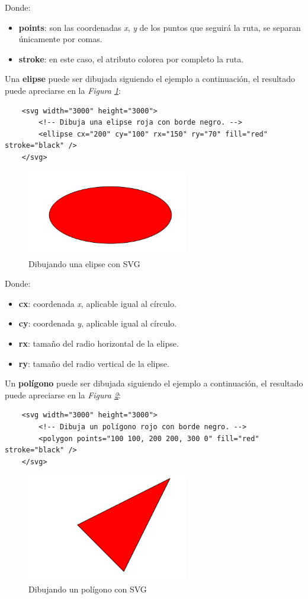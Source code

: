 Donde:
\begin{itemize}
    \item \textbf{points}: son las coordenadas \textit{x}, \textit{y} de los puntos que seguirá la ruta, se separan únicamente por comas.
    \item \textbf{stroke}: en este caso, el atributo colorea por completo la ruta.
\end{itemize}

Una \textbf{elipse} puede ser dibujada siguiendo el ejemplo a continuación, el resultado puede apreciarse en la \textit{Figura \ref{fig: 24}}:
\begin{lstlisting}
    <svg width="3000" height="3000">
        <!-- Dibuja una elipse roja con borde negro. -->
        <ellipse cx="200" cy="100" rx="150" ry="70" fill="red" stroke="black" />
    </svg>
\end{lstlisting}
\begin{figure}[H]
    \centering
    \caption{Dibujando una elipse con SVG}
    \label{fig: 24}
    \includegraphics[width=7cm]{ss_html/svg_ellipse.png}
\end{figure}

Donde:
\begin{itemize}
    \item \textbf{cx}: coordenada \textit{x}, aplicable igual al círculo.
    \item \textbf{cy}: coordenada \textit{y}, aplicable igual al círculo.
    \item \textbf{rx}: tamaño del radio horizontal de la elipse.
    \item \textbf{ry}: tamaño del radio vertical de la elipse.
\end{itemize}

Un \textbf{polígono} puede ser dibujada siguiendo el ejemplo a continuación, el resultado puede apreciarse en la \textit{Figura \ref{fig: 25}}:
\begin{lstlisting}
    <svg width="3000" height="3000">
        <!-- Dibuja un polígono rojo con borde negro. -->
        <polygon points="100 100, 200 200, 300 0" fill="red" stroke="black" />
    </svg>
\end{lstlisting}
\begin{figure}[H]
    \centering
    \caption{Dibujando un polígono con SVG}
    \label{fig: 25}
    \includegraphics[width=7cm]{ss_html/svg_polygon.png}
\end{figure}

